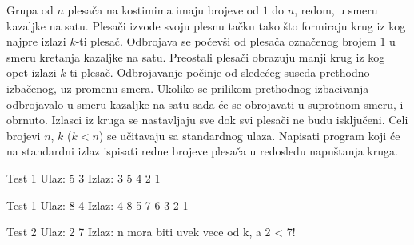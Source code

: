 \begin{Exercise}[label=613]
Grupa od $n$ plesača na kostimima imaju brojeve od $1$ do $n$, redom, u smeru kazaljke na satu.
Plesači izvode svoju plesnu tačku tako što formiraju krug iz kog najpre izlazi $k$-ti plesač.
Odbrojava se počevši od plesača označenog brojem $1$ u smeru kretanja kazaljke na satu. 
Preostali plesači obrazuju manji krug iz kog opet izlazi $k$-ti plesač. Odbrojavanje počinje od
sledećeg suseda prethodno izbačenog, uz promenu smera. Ukoliko se prilikom prethodnog izbacivanja odbrojavalo 
u smeru kazaljke na satu sada će se obrojavati u suprotnom smeru, i obrnuto. Izlasci iz kruga se nastavljaju
sve dok svi plesači ne budu isključeni. 
Celi brojevi $n$, $k$ ($k < n$) se učitavaju sa standardnog ulaza. 
Napisati program koji će na standardni izlaz ispisati redne brojeve plesača u redosledu napuštanja kruga. 

\begin{miditest}
\begin{test}{Test 1}
Ulaz: 
  5 3 
Izlaz: 
  3 5 4 2 1
\end{test}
\end{miditest}
\begin{minitest}
\begin{test}{Test 1}
Ulaz: 
  8 4 
Izlaz: 
  4 8 5 7 6 3 2 1
\end{test}
\end{minitest}
\begin{miditest}
\begin{test}{Test 2}
Ulaz: 
  2 7 
Izlaz: 
  n mora biti uvek vece od k, a 2 < 7!
\end{test}
\end{miditest}

\end{Exercise}
\begin{Answer}[ref=613]
\end{Answer}